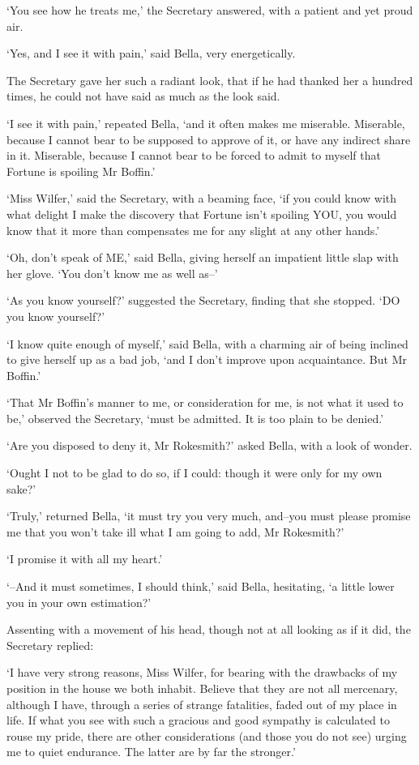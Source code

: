 ‘You see how he treats me,’ the Secretary answered, with a patient and
yet proud air.

‘Yes, and I see it with pain,’ said Bella, very energetically.

The Secretary gave her such a radiant look, that if he had thanked her a
hundred times, he could not have said as much as the look said.

‘I see it with pain,’ repeated Bella, ‘and it often makes me miserable.
Miserable, because I cannot bear to be supposed to approve of it, or
have any indirect share in it. Miserable, because I cannot bear to be
forced to admit to myself that Fortune is spoiling Mr Boffin.’

‘Miss Wilfer,’ said the Secretary, with a beaming face, ‘if you could
know with what delight I make the discovery that Fortune isn’t spoiling
YOU, you would know that it more than compensates me for any slight at
any other hands.’

‘Oh, don’t speak of ME,’ said Bella, giving herself an impatient little
slap with her glove. ‘You don’t know me as well as--’

‘As you know yourself?’ suggested the Secretary, finding that she
stopped. ‘DO you know yourself?’

‘I know quite enough of myself,’ said Bella, with a charming air of
being inclined to give herself up as a bad job, ‘and I don’t improve
upon acquaintance. But Mr Boffin.’

‘That Mr Boffin’s manner to me, or consideration for me, is not what it
used to be,’ observed the Secretary, ‘must be admitted. It is too plain
to be denied.’

‘Are you disposed to deny it, Mr Rokesmith?’ asked Bella, with a look of
wonder.

‘Ought I not to be glad to do so, if I could: though it were only for my
own sake?’

‘Truly,’ returned Bella, ‘it must try you very much, and--you must
please promise me that you won’t take ill what I am going to add, Mr
Rokesmith?’

‘I promise it with all my heart.’

‘--And it must sometimes, I should think,’ said Bella, hesitating, ‘a
little lower you in your own estimation?’

Assenting with a movement of his head, though not at all looking as if
it did, the Secretary replied:

‘I have very strong reasons, Miss Wilfer, for bearing with the drawbacks
of my position in the house we both inhabit. Believe that they are not
all mercenary, although I have, through a series of strange fatalities,
faded out of my place in life. If what you see with such a gracious
and good sympathy is calculated to rouse my pride, there are other
considerations (and those you do not see) urging me to quiet endurance.
The latter are by far the stronger.’

